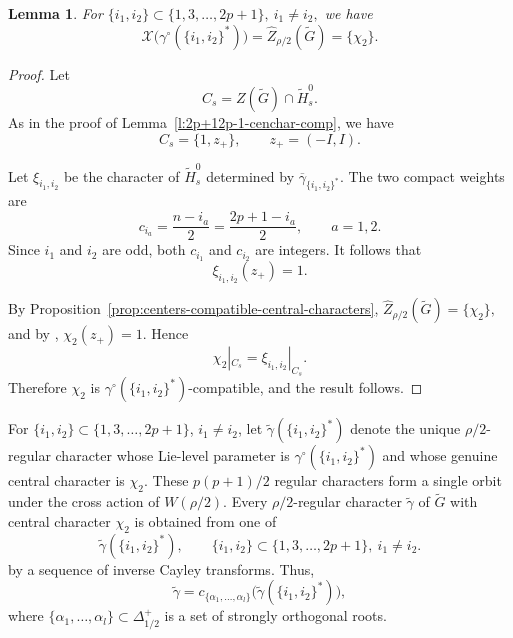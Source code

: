 \documentclass{amsart}
\newtheorem{lemma}[thm]{Lemma}
\theoremstyle{definition}
\newcommand{\tu}{\widetilde}
\begin{document}
\begin{lemma}
For $\{i_1,i_2\}\subset\{1,3,\ldots,2p+1\},
\  i_1\neq i_2,$
we have
\[
\mathcal X\bigl(\gamma^\circ(\{i_1,i_2\}^*)\bigr)
=
\widehat Z_{\rho/2}(\widetilde G)
=
\{\chi_2\}.
\]
\end{lemma}

\begin{proof}
Let
\[
C_s
=
Z(\widetilde G)\cap \widetilde H_s^0.
\]
As in the proof of
Lemma~\ref{l:2p+12p-1-cenchar-comp}, we have
\[
C_s=\{1,z_+\},
\qquad
z_+=(-I,I).
\]

Let \(\xi_{i_1,i_2}\) be the character of
\(\widetilde H_s^0\) determined by
\(\overline\gamma_{\{i_1,i_2\}^*}\).
The two compact weights are
\[
c_{i_a}
=
\frac{n-i_a}{2}
=
\frac{2p+1-i_a}{2},
\qquad a=1,2.
\]
Since \(i_1\) and \(i_2\) are odd, both \(c_{i_1}\) and
\(c_{i_2}\) are integers. It follows that
\[
\xi_{i_1,i_2}(z_+)=1.
\]

By Proposition~\ref{prop:centers-compatible-central-characters},
$\widehat Z_{\rho/2}(\widetilde G)=\{\chi_2\},
$ and by \cite[Lemma 6.2]{BTs18},
$\chi_2(z_+)=1.$
Hence
\[
\chi_2|_{C_s}
=
\xi_{i_1,i_2}|_{C_s}.
\]
Therefore \(\chi_2\) is
\(\gamma^\circ(\{i_1,i_2\}^*)\)-compatible, and the result follows.
\end{proof}


For \(\{i_1,i_2\}\subset\{1,3,\ldots,2p+1\}\), $i_1\neq i_2$,  let
$\widetilde\gamma(\{i_1,i_2\}^*)$
denote the unique  \(\rho/2\)-regular character whose Lie-level
parameter is \(\gamma^\circ(\{i_1, i_2\}^*)\) and whose genuine central character is  $\chi_2$. 
These \(p(p+1)/2\) regular characters form a single orbit under
the cross action of \(W(\rho/2)\).
Every \(\rho/2\)-regular 
character $\tu\gamma$ of \(\widetilde G\) with central character \(\chi_2\) is
obtained from one of
\begin{equation*}
\tu\gamma(\{i_1,i_2\}^*),
\qquad
\{i_1,i_2\}\subset \{1,3,\ldots,2p+1\}, \ i_1\neq i_2.
\end{equation*}
by a sequence of inverse Cayley transforms. Thus, 
 \begin{equation*}
\tu\gamma=
c_{\{\alpha_1,\ldots,\alpha_l \}}\bigl(\tu\gamma( \{i_1,i_2\}^*)\bigr),
\end{equation*}
where $\{\alpha_1,\ldots,\alpha_l \}\subset \Delta_{1/2}^+$ is a set of strongly orthogonal roots.
\end{document}
